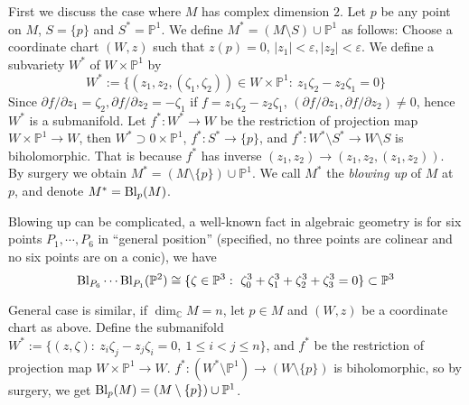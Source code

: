 \begin{eg}[Blowing up]
    First we discuss the case where $M$ has complex dimension $2$.
    Let $p$ be any point on $M$, $S=\{p\}$ and $S^*=\mathbb{P}^1$.
    We define $M^*=(M\setminus S)\cup\mathbb{P}^1$ as follows:
    Choose a coordinate chart $(W,z)$ such that $z(p)=0$, $|z_1|<\varepsilon,|z_2|<\varepsilon$.
    We define a subvariety $W^*$ of $W\times\mathbb{P}^1$ by
    \[W^*:=\{(z_1,z_2,(\zeta_1,\zeta_2))\in W\times\mathbb{P}^1:\ z_1\zeta_2-z_2\zeta_1=0\}\]
    Since $\partial{f}/\partial{z_1}=\zeta_2,\partial{f}/\partial{z_2}=-\zeta_1$ if $f=z_1\zeta_2-z_2\zeta_1$, $(\partial{f}/\partial{z_1},\partial{f}/\partial{z_2})\neq 0$, hence $W^*$ is a submanifold.
    Let $f^*:W^*\to W$ be the restriction of projection map $W\times\mathbb{P}^1\to W$, then $W^*\supset 0\times\mathbb{P}^1$, $f^*:S^*\to\{p\}$, and $f^*:W^*\setminus S^*\to W\setminus S$ is biholomorphic.
    That is because $f^*$ has inverse $(z_1,z_2)\to(z_1,z_2,(z_1,z_2))$.
    By surgery we obtain $M^*=(M\setminus\{p\})\cup\mathbb{P}^1$.
    We call $M^*$ the \emph{blowing up} of $M$ at $p$, and denote $M^*=\operatorname{Bl}_p(M)$.

    Blowing up can be complicated, a well-known fact in algebraic geometry is for six points $P_1,\cdots,P_6$ in ``general position'' (specified, no three points are colinear and no six points are on a conic), we have
    \[\Bl_{P_6}\cdots\Bl_{P_1}(\mathbb{P}^2)\cong\{\zeta\in\mathbb{P}^3:\ \zeta_0^3+\zeta_1^3+\zeta_2^3+\zeta_3^3=0\}\subset\mathbb{P}^3\]

    General case is similar, if $\dim_\mathbb{C}M=n$, let $p\in M$ and $(W,z)$ be a coordinate chart as above.
    Define the submanifold $W^*:=\{(z,\zeta):\ z_i\zeta_j-z_j\zeta_i=0,\ 1\leq i<j\leq n\}$, and $f^*$ be the restriction of projection map $W\times\mathbb{P}^1\to W$.
    $f^*:(W^*\setminus\mathbb{P}^1)\to(W\setminus\{p\})$ is biholomorphic, so by surgery, we get $\operatorname{Bl}_p(M)=(M\setminus\{p\})\cup\mathbb{P}^1$.
\end{eg}